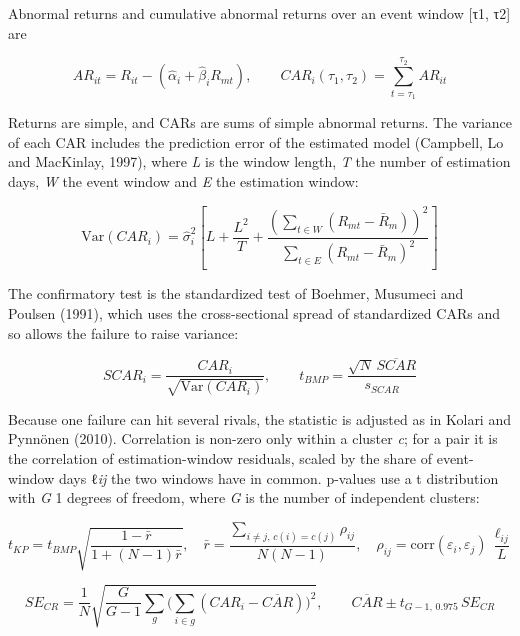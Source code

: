 \documentclass[12pt,a4paper]{article}
\begin{document}
Abnormal returns and cumulative abnormal returns over an event window [τ1, τ2] are

\begin{equation}
AR_{it} = R_{it} - (\hat\alpha_i + \hat\beta_i R_{mt}), \qquad CAR_i(\tau_1,\tau_2) = \sum_{t=\tau_1}^{\tau_2} AR_{it}
\end{equation}

Returns are simple, and CARs are sums of simple abnormal returns. The variance of each CAR includes the prediction error of the estimated model (Campbell, Lo and MacKinlay, 1997), where \emph{L} is the window length, \emph{T} the number of estimation days, \emph{W} the event window and \emph{E} the estimation window:

\begin{equation}
\mathrm{Var}(CAR_i) = \hat\sigma_i^2\left[L + \frac{L^2}{T} + \frac{\left(\sum_{t\in W}(R_{mt}-\bar R_m)\right)^2}{\sum_{t\in E}(R_{mt}-\bar R_m)^2}\right]
\end{equation}

The confirmatory test is the standardized test of Boehmer, Musumeci and Poulsen (1991), which uses the cross-sectional spread of standardized CARs and so allows the failure to raise variance:

\begin{equation}
SCAR_i = \frac{CAR_i}{\sqrt{\mathrm{Var}(CAR_i)}}, \qquad t_{BMP} = \frac{\sqrt{N}\,\overline{SCAR}}{s_{SCAR}}
\end{equation}

Because one failure can hit several rivals, the statistic is adjusted as in Kolari and Pynnönen (2010). Correlation is non-zero only within a cluster \emph{c}; for a pair it is the correlation of estimation-window residuals, scaled by the share of event-window days ℓ\emph{ij} the two windows have in common. p-values use a t distribution with \emph{G} \textminus{} 1 degrees of freedom, where \emph{G} is the number of independent clusters:

\begin{equation}
t_{KP} = t_{BMP}\sqrt{\frac{1-\bar r}{1+(N-1)\bar r}}, \quad \bar r = \frac{\sum_{i\neq j,\,c(i)=c(j)} \rho_{ij}}{N(N-1)}, \quad \rho_{ij} = \mathrm{corr}(\varepsilon_i,\varepsilon_j)\,\frac{\ell_{ij}}{L}
\end{equation}

\begin{equation}
SE_{CR} = \frac{1}{N}\sqrt{\frac{G}{G-1}\sum_g\Big(\sum_{i\in g}(CAR_i-\overline{CAR})\Big)^2}, \qquad \overline{CAR} \pm t_{G-1,\,0.975}\,SE_{CR}
\end{equation}
\end{document}
